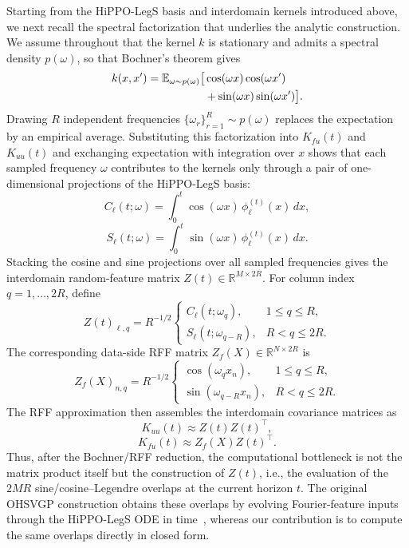 \documentclass{article}
\theoremstyle{plain}
\theoremstyle{definition}
\theoremstyle{remark}
\begin{document}
Starting from the HiPPO-LegS basis and interdomain kernels introduced above, we next recall the spectral factorization that underlies the analytic construction. We assume throughout that the kernel $k$ is stationary and admits a spectral density $p(\omega)$, so that Bochner's theorem gives \citep{Rudin1994,Rahimi2007}
\begin{align}
k(x,x') = \mathbb{E}_{\omega \sim p(\omega)}\bigl[&\cos(\omega x)\cos(\omega x') \notag \\
&+ \sin(\omega x)\sin(\omega x')\bigr].
\end{align}
Drawing $R$ independent frequencies $\{\omega_r\}_{r=1}^{R} \sim p(\omega)$ replaces the expectation by an empirical average. Substituting this factorization into $K_{fu}(t)$ and $K_{uu}(t)$ and exchanging expectation with integration over $x$ shows that each sampled frequency $\omega$ contributes to the kernels only through a pair of one-dimensional projections of the HiPPO-LegS basis:
\begin{equation}
C_\ell(t;\omega)=\int_0^t \cos(\omega x)\,\phi_\ell^{(t)}(x)\,dx,
\end{equation}
\begin{equation}
S_\ell(t;\omega)=\int_0^t \sin(\omega x)\,\phi_\ell^{(t)}(x)\,dx.
\end{equation}
Stacking the cosine and sine projections over all sampled
frequencies gives the interdomain random-feature matrix
$Z(t)\in\mathbb{R}^{M\times 2R}$. For column index
$q=1,\ldots,2R$, define
\begin{equation}
Z(t)_{\ell,q}
=
R^{-1/2}
\begin{cases}
C_\ell(t;\omega_q), & 1\le q\le R,\\
S_\ell(t;\omega_{q-R}), & R< q\le 2R.
\end{cases}
\end{equation}
The corresponding data-side RFF matrix
$Z_f(X)\in\mathbb{R}^{N\times 2R}$ is
\begin{equation}
Z_f(X)_{n,q}
=
R^{-1/2}
\begin{cases}
\cos(\omega_q x_n), & 1\le q\le R,\\
\sin(\omega_{q-R}x_n), & R< q\le 2R.
\end{cases}
\end{equation}
The RFF approximation then assembles the interdomain
covariance matrices as
\begin{equation}
K_{uu}(t) \approx Z(t)Z(t)^\top,
\end{equation}
\begin{equation}
K_{fu}(t) \approx Z_f(X)Z(t)^\top.
\end{equation}
Thus, after the Bochner/RFF reduction, the computational bottleneck is not the matrix product itself but the construction of $Z(t)$, i.e., the evaluation of the $2MR$ sine/cosine--Legendre overlaps at the current horizon $t$. The original OHSVGP construction obtains these overlaps by evolving Fourier-feature inputs through the HiPPO-LegS ODE in time~\citep{Chen2025}, whereas our contribution is to compute the same overlaps directly in closed form.
\end{document}
